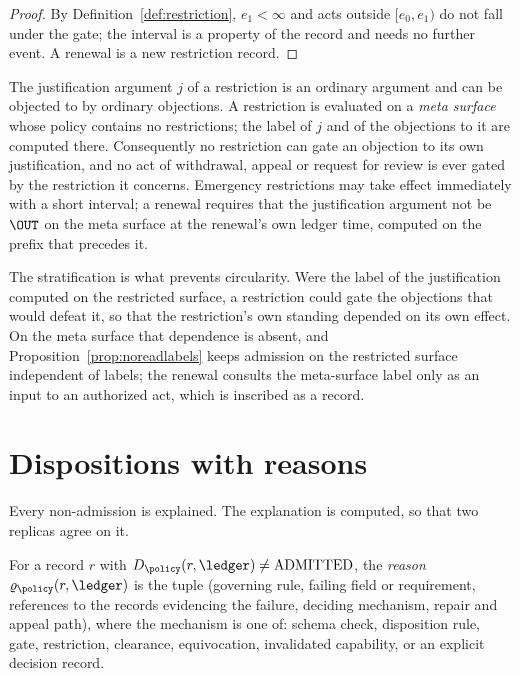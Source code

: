 \begin{proof}
By Definition~\ref{def:restriction}, $e_1<\infty$ and acts outside $[e_0,e_1)$ do not fall under the gate; the interval is a property of the record and needs no further event. A renewal is a new restriction record.
\end{proof}

\begin{designrule}\label{rule:stratified}
The justification argument $j$ of a restriction is an ordinary argument and can be objected to by ordinary objections. A restriction is evaluated on a \emph{meta surface} whose policy contains no restrictions; the label of $j$ and of the objections to it are computed there. Consequently no restriction can gate an objection to its own justification, and no act of withdrawal, appeal or request for review is ever gated by the restriction it concerns. Emergency restrictions may take effect immediately with a short interval; a renewal requires that the justification argument not be $\OUT$ on the meta surface at the renewal's own ledger time, computed on the prefix that precedes it.
\end{designrule}

The stratification is what prevents circularity. Were the label of the justification computed on the restricted surface, a restriction could gate the objections that would defeat it, so that the restriction's own standing depended on its own effect. On the meta surface that dependence is absent, and Proposition~\ref{prop:noreadlabels} keeps admission on the restricted surface independent of labels; the renewal consults the meta-surface label only as an input to an authorized act, which is inscribed as a record.

\section{Dispositions with reasons}\label{sec:dispreasons}

Every non-admission is explained. The explanation is computed, so that two replicas agree on it.

\begin{definition}[Reason]\label{def:reason}
For a record $r$ with $D_\policy(r,\ledger)\ne\mathrm{ADMITTED}$, the \emph{reason} $\varrho_\policy(r,\ledger)$ is the tuple (governing rule, failing field or requirement, references to the records evidencing the failure, deciding mechanism, repair and appeal path), where the mechanism is one of: schema check, disposition rule, gate, restriction, clearance, equivocation, invalidated capability, or an explicit decision record.
\end{definition}

